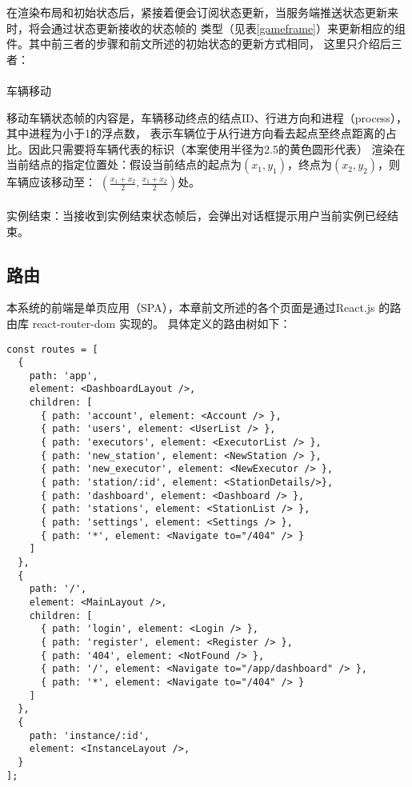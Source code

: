 在渲染布局和初始状态后，紧接着便会订阅状态更新，当服务端推送状态更新来时，将会通过状态更新接收的状态帧的
类型（见表\ref{gameframe}）来更新相应的组件。其中前三者的步骤和前文所述的初始状态的更新方式相同，
这里只介绍后三者：

\paragraph{} 车辆移动

移动车辆状态帧的内容是，车辆移动终点的结点ID、行进方向和进程（process），其中进程为小于1的浮点数，
表示车辆位于从行进方向看去起点至终点距离的占比。因此只需要将车辆代表的标识（本案使用半径为2.5的黄色圆形代表）
渲染在当前结点的指定位置处：假设当前结点的起点为$(x_1, y_1)$，终点为$(x_2, y_2)$，则车辆应该移动至：
$\displaystyle(\frac{x_1 + x_2}{2}, \frac{x_1 + x_2}{2})$处。

\paragraph{} 实例结束：当接收到实例结束状态帧后，会弹出对话框提示用户当前实例已经结束。

\subsection{路由}

本系统的前端是单页应用（SPA），本章前文所述的各个页面是通过React.js 的路由库 react-router-dom\cite{subramanian2019react} 实现的。
具体定义的路由树如下：

\begin{lstlisting}
const routes = [
  {
    path: 'app',
    element: <DashboardLayout />,
    children: [
      { path: 'account', element: <Account /> },
      { path: 'users', element: <UserList /> },
      { path: 'executors', element: <ExecutorList /> },
      { path: 'new_station', element: <NewStation /> },
      { path: 'new_executor', element: <NewExecutor /> },
      { path: 'station/:id', element: <StationDetails/>},
      { path: 'dashboard', element: <Dashboard /> },
      { path: 'stations', element: <StationList /> },
      { path: 'settings', element: <Settings /> },
      { path: '*', element: <Navigate to="/404" /> }
    ]
  },
  {
    path: '/',
    element: <MainLayout />,
    children: [
      { path: 'login', element: <Login /> },
      { path: 'register', element: <Register /> },
      { path: '404', element: <NotFound /> },
      { path: '/', element: <Navigate to="/app/dashboard" /> },
      { path: '*', element: <Navigate to="/404" /> }
    ]
  },
  {
    path: 'instance/:id',
    element: <InstanceLayout />,
  }
];
\end{lstlisting}